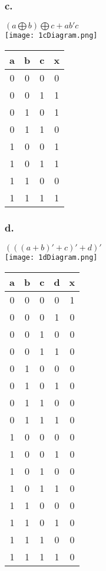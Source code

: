 \documentclass[a4paper,man,natbib]{apa6}
\begin{document}
\subsubsection{c.}
\emph{$	(𝑎 \bigoplus 𝑏) \bigoplus 𝑐 + 𝑎𝑏′𝑐 $} \\
\texttt{[image: 1cDiagram.png]}
\begin{tabular}{c c c | c}
	a & b & c & x \\
	\hline
	0 & 0 & 0 & 0 \\
	0 & 0 & 1 & 1 \\
	0 & 1 & 0 & 1 \\
	0 & 1 & 1 & 0 \\
	1 & 0 & 0 & 1 \\
	1 & 0 & 1 & 1 \\
	1 & 1 & 0 & 0 \\
	1 & 1 & 1 & 1 \\
\end{tabular}

\subsubsection{d.}
\emph{$ ( ( (𝑎 + 𝑏)′ + 𝑐)′ + 𝑑)′ $} \\
\texttt{[image: 1dDiagram.png]}
\begin{tabular}{c c c c | c}
	a & b & c & d & x \\
	\hline
	0 & 0 & 0 & 0 & 1 \\
	0 & 0 & 0 & 1 & 0 \\
	0 & 0 & 1 & 0 & 0 \\
	0 & 0 & 1 & 1 & 0 \\
	0 & 1 & 0 & 0 & 0 \\
	0 & 1 & 0 & 1 & 0 \\
	0 & 1 & 1 & 0 & 0 \\
	0 & 1 & 1 & 1 & 0 \\
	1 & 0 & 0 & 0 & 0 \\
	1 & 0 & 0 & 1 & 0 \\
	1 & 0 & 1 & 0 & 0 \\
	1 & 0 & 1 & 1 & 0 \\
	1 & 1 & 0 & 0 & 0 \\
	1 & 1 & 0 & 1 & 0 \\
	1 & 1 & 1 & 0 & 0 \\
	1 & 1 & 1 & 1 & 0 \\
\end{tabular}

\clearpage
\end{document}
